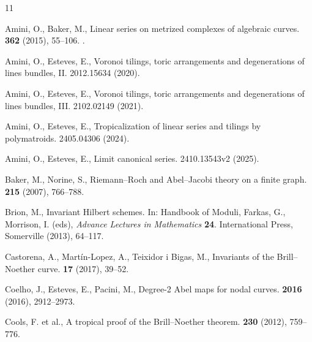 \documentclass[a4paper,11pt]{amsart}
\theoremstyle{plain}
\theoremstyle{definition}
\theoremstyle{remark}
\begin{document}

%
\begin{thebibliography}{11}

Amini, O., Baker, M.,
\newblock Linear series on metrized complexes of algebraic curves.
 \textbf{362} (2015), 55--106. .


Amini, O., Esteves, E.,
\newblock Voronoi tilings, toric arrangements and degenerations of lines bundles, II. 
 2012.15634 (2020).

Amini, O., Esteves, E.,
\newblock Voronoi tilings, toric arrangements and degenerations of lines bundles, III. 
 2102.02149 (2021).

Amini, O., Esteves, E.,
\newblock Tropicalization of linear series and tilings by polymatroids. 
 2405.04306 (2024).

Amini, O., Esteves, E.,
\newblock Limit canonical series.
 2410.13543v2 (2025).

Baker, M., Norine, S.,
\newblock Riemann--Roch and Abel--Jacobi theory on a finite graph.
 \textbf{215} (2007), 766--788.

Brion, M.,
\newblock Invariant Hilbert schemes. 
\newblock In: Handbook of Moduli, Farkas, G., Morrison, I. (eds),  {\em Advance Lectures in Mathematics} \textbf{24}. International Press, Somerville (2013), 64--117.


Castorena, A., Martín-Lopez, A., Teixidor i Bigas, M.,
\newblock Invariants of the Brill--Noether curve.
 \textbf{17} (2017), 39--52.

Coelho, J., Esteves, E., Pacini, M.,
\newblock Degree-2 Abel maps for nodal curves.
 \textbf{2016} (2016), 2912--2973.

Cools, F. et al.,
\newblock A tropical proof of the Brill--Noether theorem.
 \textbf{230} (2012), 759--776.


\end{thebibliography}
\end{document}
